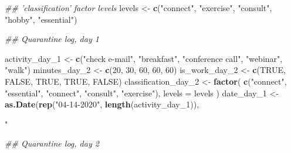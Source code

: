 \documentclass[
]{book}
\newenvironment{Shaded}{\begin{snugshade}}{\end{snugshade}}
\newcommand{\CommentTok}[1]{\textcolor[rgb]{0.56,0.35,0.01}{\textit{#1}}}
\newcommand{\DataTypeTok}[1]{\textcolor[rgb]{0.13,0.29,0.53}{#1}}
\newcommand{\DecValTok}[1]{\textcolor[rgb]{0.00,0.00,0.81}{#1}}
\newcommand{\KeywordTok}[1]{\textcolor[rgb]{0.13,0.29,0.53}{\textbf{#1}}}
\newcommand{\NormalTok}[1]{#1}
\newcommand{\OtherTok}[1]{\textcolor[rgb]{0.56,0.35,0.01}{#1}}
\newcommand{\StringTok}[1]{\textcolor[rgb]{0.31,0.60,0.02}{#1}}
\begin{document}
\begin{Shaded}
\begin{Highlighting}[]
\CommentTok{## 'classification' factor levels}
\NormalTok{levels <-}\StringTok{ }\KeywordTok{c}\NormalTok{(}\StringTok{"connect"}\NormalTok{, }\StringTok{"exercise"}\NormalTok{, }\StringTok{"consult"}\NormalTok{, }\StringTok{"hobby"}\NormalTok{, }\StringTok{"essential"}\NormalTok{)}

\CommentTok{## Quarantine log, day 1}

\NormalTok{activity_day_}\DecValTok{1}\NormalTok{ <-}
\StringTok{    }\KeywordTok{c}\NormalTok{(}\StringTok{"check e-mail"}\NormalTok{, }\StringTok{"breakfast"}\NormalTok{, }\StringTok{"conference call"}\NormalTok{, }\StringTok{"webinar"}\NormalTok{, }\StringTok{"walk"}\NormalTok{)}
\NormalTok{minutes_day_}\DecValTok{2}\NormalTok{ <-}\StringTok{ }\KeywordTok{c}\NormalTok{(}\DecValTok{20}\NormalTok{, }\DecValTok{30}\NormalTok{, }\DecValTok{60}\NormalTok{, }\DecValTok{60}\NormalTok{, }\DecValTok{60}\NormalTok{)}
\NormalTok{is_work_day_}\DecValTok{2}\NormalTok{ <-}\StringTok{ }\KeywordTok{c}\NormalTok{(}\OtherTok{TRUE}\NormalTok{, }\OtherTok{FALSE}\NormalTok{, }\OtherTok{TRUE}\NormalTok{, }\OtherTok{TRUE}\NormalTok{, }\OtherTok{FALSE}\NormalTok{)}
\NormalTok{classification_day_}\DecValTok{2}\NormalTok{ <-}\StringTok{ }\KeywordTok{factor}\NormalTok{(}
    \KeywordTok{c}\NormalTok{(}\StringTok{"connect"}\NormalTok{, }\StringTok{"essential"}\NormalTok{, }\StringTok{"connect"}\NormalTok{, }\StringTok{"consult"}\NormalTok{, }\StringTok{"exercise"}\NormalTok{),}
    \DataTypeTok{levels =}\NormalTok{ levels}
\NormalTok{)}
\NormalTok{date_day_}\DecValTok{1}\NormalTok{ <-}\StringTok{ }\KeywordTok{as.Date}\NormalTok{(}\KeywordTok{rep}\NormalTok{(}\StringTok{"04-14-2020"}\NormalTok{, }\KeywordTok{length}\NormalTok{(activity_day_}\DecValTok{1}\NormalTok{)), }\StringTok{"%

\CommentTok{## Quarantine log, day 2}

}
\end{Highlighting}
\end{Shaded}
\end{document}

